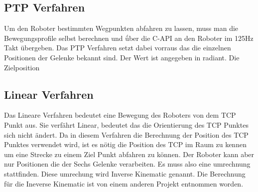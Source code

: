 \subsection{PTP Verfahren}
\label{ptp_capi_gru}

Um den Roboter bestimmten Wegpunkten abfahren zu lassen, muss man die Bewegungsprofile selbst berechnen und ǘber die C-API an den Roboter im 125Hz Takt übergeben. Das PTP Verfahren setzt dabei vorraus das die einzelnen Positionen der Gelenke bekannt sind. Der Wert ist angegeben in radiant. Die Zielposition

\subsection{Linear Verfahren}
\label{linear_capi_gru}

Das Lineare Verfahren bedeutet eine Bewegung des Roboters von dem TCP Punkt aus. Sie verfährt Linear, bedeutet das die Orientierung 
des TCP Punktes sich nicht ändert. Da in diesem Verfahren die Berechnung der Position des TCP Punktes verwendet wird, ist es nötig die Position des TCP im Raum zu kennen um eine Strecke zu einem Ziel Punkt abfahren zu können. Der Roboter kann aber nur Positionen die der Sechs Gelenke verarbeiten. Es muss also eine umrechnung stattfinden. Diese umrechung wird Inverse Kinematic genannt. Die Berechnung für die Ineverse Kinematic ist von einem anderen Projekt entnommen worden.